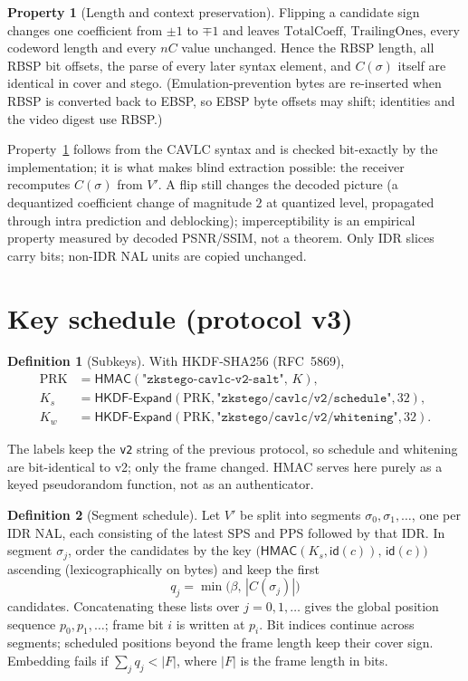 \documentclass[11pt,a4paper]{article}
\theoremstyle{definition}
\newtheorem{definition}{Definition}
\newtheorem{property}{Property}
\theoremstyle{remark}
\newcommand{\HMAC}{\mathsf{HMAC}}
\newcommand{\Expand}{\mathsf{HKDF\text{-}Expand}}
\newcommand{\id}{\mathsf{id}}
\begin{document}
\begin{property}[Length and context preservation]\label{prop:flip}
Flipping a candidate sign changes one coefficient from $\pm1$ to $\mp1$ and
leaves $\mathrm{TotalCoeff}$, $\mathrm{TrailingOnes}$, every codeword length
and every $nC$ value unchanged. Hence the RBSP length, all RBSP bit offsets,
the parse of every later syntax element, and $C(\sigma)$ itself are identical
in cover and stego. (Emulation-prevention bytes are re-inserted when RBSP is
converted back to EBSP, so EBSP byte offsets may shift; identities and the
video digest use RBSP.)
\end{property}

Property~\ref{prop:flip} follows from the CAVLC syntax and is checked
bit-exactly by the implementation; it is what makes blind extraction possible:
the receiver recomputes $C(\sigma)$ from $V'$. A flip still changes the decoded
picture (a dequantized coefficient change of magnitude $2$ at quantized level,
propagated through intra prediction and deblocking); imperceptibility is an
empirical property measured by decoded PSNR/SSIM, not a theorem. Only IDR
slices carry bits; non-IDR NAL units are copied unchanged.

\section{Key schedule (protocol v3)}
\begin{definition}[Subkeys]
With HKDF-SHA256 (RFC~5869),
\begin{align*}
\mathrm{PRK} &= \HMAC(\texttt{"zkstego-cavlc-v2-salt"},\,K),\\
K_s &= \Expand(\mathrm{PRK},\texttt{"zkstego/cavlc/v2/schedule"},32),\\
K_w &= \Expand(\mathrm{PRK},\texttt{"zkstego/cavlc/v2/whitening"},32).
\end{align*}
\end{definition}
The labels keep the \texttt{v2} string of the previous protocol, so schedule
and whitening are bit-identical to v2; only the frame changed. HMAC serves
here purely as a keyed pseudorandom function, not as an authenticator.

\begin{definition}[Segment schedule]
Let $V'$ be split into segments $\sigma_0,\sigma_1,\ldots$, one per IDR NAL,
each consisting of the latest SPS and PPS followed by that IDR. In segment
$\sigma_j$, order the candidates by the key
$\bigl(\HMAC(K_s,\id(c)),\,\id(c)\bigr)$ ascending (lexicographically on bytes)
and keep the first
\[
q_j=\min\bigl(\beta,\,|C(\sigma_j)|\bigr)
\]
candidates. Concatenating these lists over $j=0,1,\ldots$ gives the global
position sequence $p_0,p_1,\ldots$; frame bit $i$ is written at $p_i$. Bit
indices continue across segments; scheduled positions beyond the frame length
keep their cover sign. Embedding fails if
$\sum_j q_j<|F|$, where $|F|$ is the frame length in bits.
\end{definition}
\end{document}
